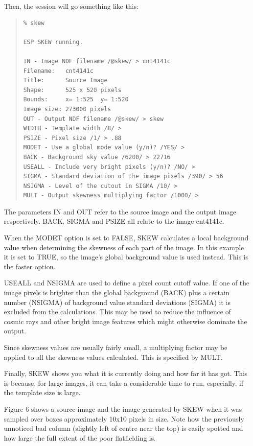 \documentclass[twoside,11pt]{article}
\newenvironment{myquote}{\begin{quote}\begin{small}}{\end{small}\end{quote}}
\begin{document}
Then, the session will go something like this:

\begin{myquote}
\begin{verbatim}
% skew
 
ESP SKEW running.

IN - Image NDF filename /@skew/ > cnt4141c
Filename:   cnt4141c
Title:      Source Image
Shape:      525 x 520 pixels
Bounds:     x= 1:525  y= 1:520
Image size: 273000 pixels
OUT - Output NDF filename /@skew/ > skew
WIDTH - Template width /8/ > 
PSIZE - Pixel size /1/ > .88
MODET - Use a global mode value (y/n)? /YES/ > 
BACK - Background sky value /6200/ > 22716
USEALL - Include very bright pixels (y/n)? /NO/ > 
SIGMA - Standard deviation of the image pixels /390/ > 56
NSIGMA - Level of the cutout in SIGMA /10/ > 
MULT - Output skewness multiplying factor /1000/ > 
\end{verbatim}
\end{myquote}

The parameters IN and OUT refer to the source image and the output image
respectively. BACK, SIGMA and PSIZE all relate to the image 
cnt4141c. 

When the MODET option is set to FALSE, SKEW calculates a local background
value when determining the skewness of each part of the image. In this
example it is set to TRUE, so the image's global background value is used
instead. This is the faster option.

USEALL and NSIGMA are used to define a pixel count cutoff value. If one of the
image pixels is brighter than the global background (BACK) plus a certain 
number (NSIGMA) of background value standard deviations (SIGMA) it is excluded from the
calculations. This may be used to reduce the influence of cosmic rays and
other bright image features which might otherwise dominate the output.

Since skewness values are usually fairly small, a multiplying factor may be
applied to all the skewness values calculated. This is specified by MULT.

Finally, SKEW shows you what it is currently doing and how
far it has got. This is because, for large images, it can
take a considerable time to run, especially, if the template size is large.

Figure 6 shows a source image and the image generated by SKEW when it was sampled
over boxes approximately 10x10 pixels in size. Note how the previously 
unnoticed bad column (slightly left of centre near the top) is easily spotted
and how large the full extent of the poor flatfielding is.
\end{document}
